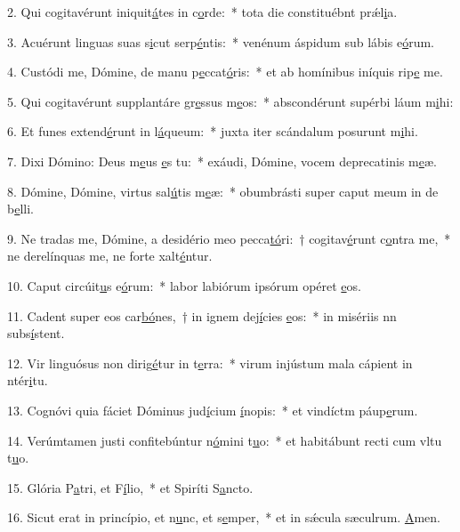 2. Qui cogitavérunt iniquit\uline{á}tes in c\uline{o}rde:~* tota die constituébnt prǽl\uline{i}a.\par 
3. Acuérunt linguas suas s\uline{i}cut serp\uline{é}ntis:~* venénum áspidum sub lábis e\uline{ó}rum.\par 
4. Custódi me, Dómine, de manu p\uline{e}ccat\uline{ó}ris:~* et ab homínibus iníquis rip\uline{e} me.\par 
5. Qui cogitavérunt supplantáre gr\uline{e}ssus m\uline{e}os:~* abscondérunt supérbi láum m\uline{i}hi:\par 
6. Et funes extend\uline{é}runt in l\uline{á}queum:~* juxta iter scándalum posurunt m\uline{i}hi.\par 
7. Dixi Dómino: Deus m\uline{e}us \uline{e}s tu:~* exáudi, Dómine, vocem deprecatinis m\uline{e}æ.\par 
8. Dómine, Dómine, virtus sal\uline{ú}tis m\uline{e}æ:~* obumbrásti super caput meum in de b\uline{e}lli.\par 
9. Ne tradas me, Dómine, a desidério meo pecca\uline{tó}ri:~† cogitav\uline{é}runt c\uline{o}ntra me,~* ne derelínquas me, ne forte xalt\uline{é}ntur.\par 
10. Caput circúit\uline{u}s e\uline{ó}rum:~* labor labiórum ipsórum opéret \uline{e}os.\par 
11. Cadent super eos car\uline{bó}nes,~† in ignem dej\uline{í}cies \uline{e}os:~* in misériis nn subs\uline{í}stent.\par 
12. Vir linguósus non dirig\uline{é}tur in t\uline{e}rra:~* virum injústum mala cápient in ntér\uline{i}tu.\par 
13. Cognóvi quia fáciet Dóminus jud\uline{í}cium \uline{í}nopis:~* et vindíctm páup\uline{e}rum.\par 
14. Verúmtamen justi confitebúntur n\uline{ó}mini t\uline{u}o:~* et habitábunt recti cum vltu t\uline{u}o.\par 
15. Glória P\uline{a}tri, et F\uline{í}lio,~* et Spiríti S\uline{a}ncto.\par 
16. Sicut erat in princípio, et n\uline{u}nc, et s\uline{e}mper,~* et in sǽcula sæculrum. \uline{A}men.\par 
